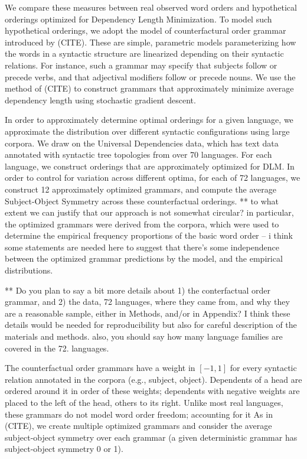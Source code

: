 \documentclass[11pt,a4paper]{article}
\newcommand\comment[1]{{\color{red}#1}}
\begin{document}
We compare these measures between real observed word orders and hypothetical orderings optimized for Dependency Length Minimization.
To model such hypothetical orderings, we adopt the model of {counterfactural order grammar} introduced by (CITE).
These are simple, parametric models parameterizing how the words in a syntactic structure are linearized depending on their syntactic relations.
For instance, such a grammar may specify that subjects follow or precede verbs, and that adjectival modifiers follow or precede nouns.
We use the method of (CITE) to construct grammars that approximately minimize average dependency length using stochastic gradient descent.

In order to approximately determine optimal orderings for a given language, we approximate the distribution over different syntactic configurations using large corpora.
We draw on the Universal Dependencies data, which has text data annotated with syntactic tree topologies from over 70 languages.
For each language, we construct orderings that are approximately optimized for DLM.
In order to control for variation across different optima, for each of 72 languages, we construct 12 approximately optimized grammars, and compute the average Subject-Object Symmetry across these counterfactual orderings.
\comment{** to what extent we can justify that our approach is not somewhat circular? in particular, the optimized grammars were derived from the corpora, which were used to determine the empirical frequency proportions of the basic word order -- i think some statements are needed here to suggest that there's some independence between the optimized grammar predictions by the model, and the empirical distributions.}



\comment{** Do you plan to say a bit more details about 1) the conterfactual order grammar, and 2) the data, 72 languages, where they came from, and why they are a reasonable sample, either in Methods, and/or in Appendix? I think these details would be needed for reproducibility but also for careful description of the materials and methods. also, you should say how many language families are covered in the 72. languages.}

The counterfactual order grammars have a weight in $[-1, 1]$ for every syntactic relation annotated in the corpora (e.g., subject, object).
Dependents of a head are ordered around it in order of these weights; dependents with negative weights are placed to the left of the head, others to its right.
Unlike most real languages, these grammars do not model word order freedom; accounting for it 
As in (CITE), we create multiple optimized grammars and consider the average subject-object symmetry over each grammar (a given deterministic grammar has subject-object symmetry 0 or 1).
\end{document}
